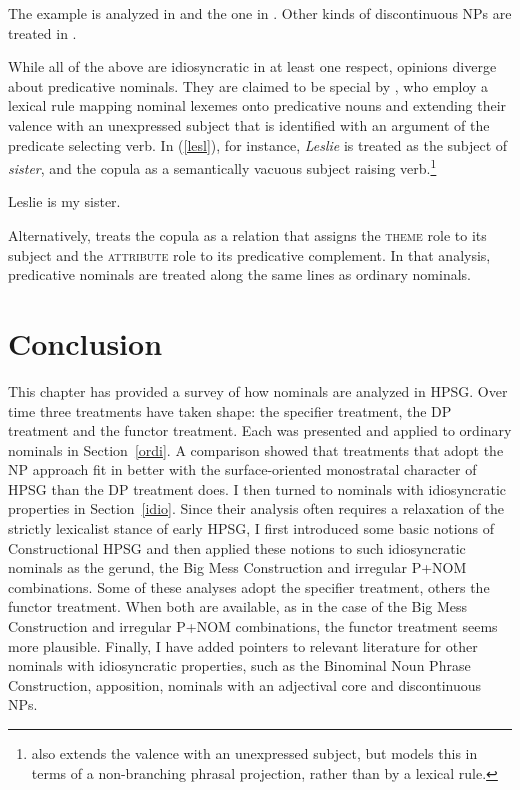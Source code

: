 \documentclass[output=paper,biblatex,babelshorthands,newtxmath,draftmode,colorlinks,citecolor=brown]{langscibook}
\begin{document}
\largerpage
\noindent
The  example is analyzed in \citet[20--21]{Abeilleetal04} and the  one in 
\citet[47--50]{VanEynde04}. Other kinds of discontinuous NPs are treated in \citet{deKuthy2002a}. 

While all of the above are idiosyncratic in at least one respect, opinions diverge about 
predicative nominals. They are claimed to be special by \citet[409]{GS00}, who 
employ a lexical rule mapping nominal lexemes onto predicative nouns and 
extending their valence with an unexpressed subject that is identified with an argument of the 
predicate selecting verb. In (\ref{lesl}), for instance, \emph{Leslie} is treated as the subject 
of \emph{sister}, and the copula as a semantically vacuous subject raising 
verb.\footnote{\citet[225]{MuellerPredication} also extends the valence with an unexpressed subject, 
but models this in terms of a non-branching phrasal projection, rather than by a lexical rule.}   

\begin{exe} 
\ex\label{lesl}   Leslie is my sister. 
\end{exe} 
   
\noindent
Alternatively, \citet[158--163]{VanEynde15} treats the copula as a relation that assigns the \textsc{theme} 
role to its subject and the \textsc{attribute} role to its predicative complement. In that analysis, 
predicative nominals are treated along the same lines as ordinary nominals.  
  

\section{Conclusion} 


This chapter has provided a survey of how nominals are analyzed in HPSG. 
Over time three treatments have taken shape: the specifier treatment, 
the DP treatment and the functor treatment. 
Each was presented and applied to ordinary nominals in Section~\ref{ordi}. 
A comparison showed that treatments that adopt the NP approach fit in better with 
the surface-oriented monostratal character of HPSG than the DP treatment does.
I then turned to nominals with idiosyncratic properties in Section~\ref{idio}.
Since their analysis often requires a relaxation of the strictly lexicalist stance of early HPSG, 
I first introduced some basic notions of Constructional HPSG and then applied these notions to 
such idiosyncratic nominals as the gerund, the Big Mess Construction and irregular P+NOM combinations.  
Some of these analyses adopt the specifier treatment, others the functor treatment. 
When both are available, as in the case of the Big Mess Construction and  
irregular P+NOM combinations, the functor treatment seems more plausible. 
Finally, I have added pointers to relevant literature for other nominals with idiosyncratic properties,
such as the Binominal Noun Phrase Construction, apposition, nominals with an adjectival core  
and discontinuous NPs. 
\end{document}
